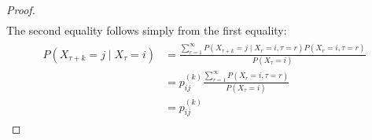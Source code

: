 \begin{proof}
\begin{gather*}
        \end{gather*}
        The second equality follows simply from the first equality:
        \begin{gather*}
        \begin{aligned}
            P\left(X_{\tau+k}=j \mid X_{\tau}=i\right) &=\frac{\sum_{r=1}^{\infty} P\left(X_{\tau+k}=j \mid X_{r}=i, \tau=r\right) P\left(X_{r}=i, \tau=r\right)}{P\left(X_{\tau}=i\right)} \\
            &=p_{i j}^{(k)} \frac{\sum_{r=1}^{\infty} P\left(X_{r}=i, \tau=r\right)}{P\left(X_{\tau}=i\right)} \\
            &=p_{i j}^{(k)}
        \end{aligned}
        \end{gather*}
    \end{proof}
\vskip 0.6in



